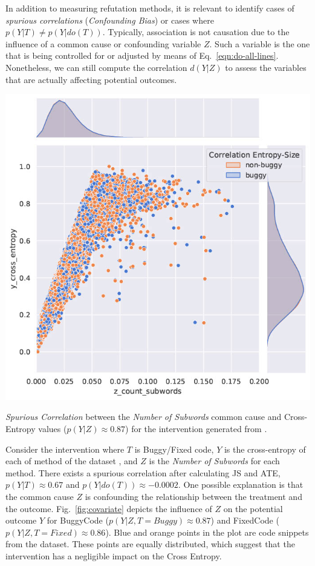 In addition to measuring refutation methods, it is relevant to identify cases of \textit{spurious correlations} (\ie \textit{Confounding Bias}) or cases where $p(Y|T)\neq p(Y|do(T))$. Typically, association is not causation due to the influence of a common cause or confounding variable $Z$. Such a variable is the one that is being controlled for or adjusted by means of Eq.~\ref{eqn:do-all-lines}. Nonetheless, we can still compute the correlation $d(Y|Z)$ to assess the variables that are actually affecting potential outcomes. 

 \begin{marginfigure}
		\centering
		\includegraphics[width=\textwidth]{graphics/fig_4_covariates_corr.jpg}
		\caption{ \textit{Spurious Correlation} between the \textit{Number of Subwords} common cause and Cross-Entropy values ($p(Y|Z)\approx0.87$) for the \datainterI intervention generated from \tf. } 
        \label{fig:covariate}
\end{marginfigure}

\begin{exmp}
\label{exmp:confounding}

Consider the \datainterI intervention where $T$ is Buggy/Fixed code, $Y$ is the cross-entropy of each of method of the dataset \BuggyTB, and $Z$ is the \textit{Number of Subwords} for each method. There exists a spurious correlation after calculating JS and ATE, $p(Y|T)\approx0.67$ and $p(Y|do(T))\approx-0.0002$. One possible explanation is that the common cause $Z$ is confounding the relationship between the treatment and the outcome. Fig.~\ref{fig:covariate} depicts the influence of $Z$ on the potential outcome $Y$ for BuggyCode ($p(Y|Z,T=Buggy)\approx0.87$) and FixedCode ($p(Y|Z,T=Fixed)\approx0.86$). Blue and orange points in the plot are code snippets from the dataset. These points are equally distributed, which suggest that the \datainterI intervention has a negligible impact on the Cross Entropy. 
\end{exmp}
